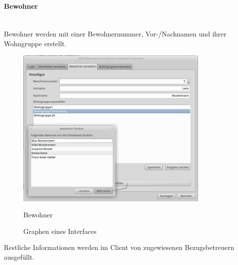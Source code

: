 \paragraph{Bewohner}\mbox{}\\
Bewohner werden mit einer Bewohnernummer, Vor-/Nachnamen und ihrer Wohngruppe  erstellt. 
\begin{figure}[h]
	\begin{center}
		\includegraphics[keepaspectratio=true, width=0.85\textwidth]{pics/admin2.png}
		\caption{Bewohner}
		\label{Admindialog Bewohner}
		\caption{Graphen eines Interfaces}
		\label{Admindialog_Bewohner}
	\end{center}
\end{figure}
\FloatBarrier
\noindent
Restliche Informationen werden im Client von zugewiesenen Bezugsbetreuern ausgefüllt.
\newpage
\noindent
